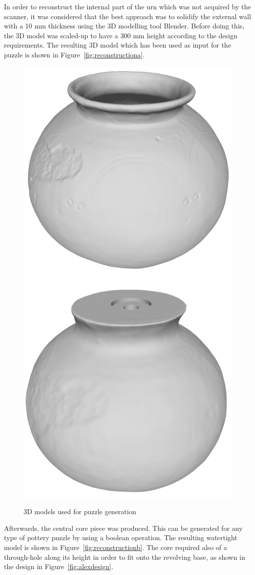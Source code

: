 \documentclass[acmlarge,screen,dvipsnames]{acmart}
\begin{document}
In order to reconstruct the internal part of the urn which was not
acquired by the scanner, it was considered that the best approach was
to solidify the external wall with a 10 mm thickness using the 3D
modelling tool Blender. Before doing this, the 3D model was scaled-up
to have a 300 mm height according to the design requirements. The
resulting 3D model which has been used as input for the puzzle is
shown in Figure~\ref{fig:reconstructiona}.
%
\begin{figure}[htb]
  \centering
  {\includegraphics[width=0.45\linewidth]{images/potcomplete}}
  {\includegraphics[width=0.45\linewidth]{images/corewhole}}
  \caption{3D models used for puzzle generation}
\end{figure}
%

Afterwards, the central core piece was produced. This can be generated
for any type of pottery puzzle by using a boolean operation. The
resulting watertight model is shown in
Figure~\ref{fig:reconstructionb}. The core required also of a
through-hole along its height in order to fit onto the revolving base,
as shown in the design in Figure~\ref{fig:alexdesign}.
\end{document}
